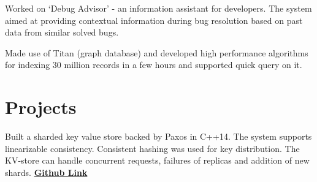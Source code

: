 \documentclass[]{resume-openfont}
\begin{document}
\begin{minipage}[t]{0.69\textwidth}
\begin{tightemize}
\item Worked on ‘Debug Advisor’ - an information assistant for developers. The system aimed at providing contextual information during bug resolution based on past data from similar solved bugs. 
\item Made use of Titan (graph database) and developed high performance algorithms for indexing 30 million records in a few hours and supported quick query on it.
\end{tightemize}
\sectionsep


\section{Projects}
Built a sharded key value store backed by Paxos in C++14. The system supports linearizable consistency. Consistent hashing was used for key distribution. The KV-store can handle concurrent requests, failures of replicas and addition of new shards. \textbf{\href{https://github.com/pranavr93/sharded_key_value_store}{Github Link}}
\sectionsep






\end{minipage}
\end{document}
